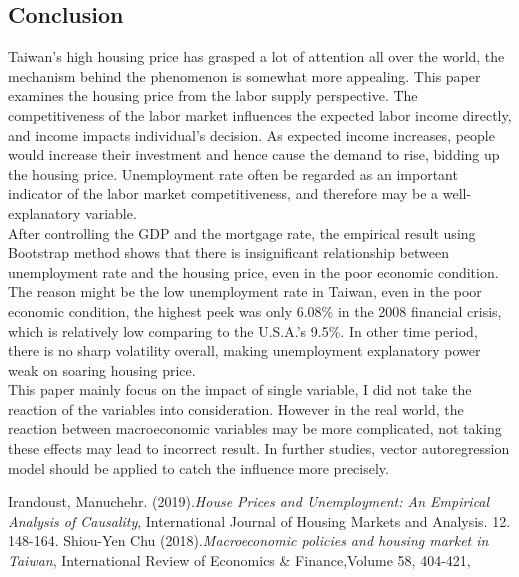 \documentclass[12pt]{article}
\begin{document}
\begin{spacing}{2}
\section{Conclusion}
Taiwan's high housing price has grasped a lot of attention all over the world, the mechanism behind the phenomenon is somewhat more appealing. This paper examines the housing price from the labor supply perspective. The competitiveness of the labor market influences the expected labor income directly, and income impacts individual's decision. As expected income increases, people would increase their investment and hence cause the demand to rise, bidding up the housing price. Unemployment rate often be regarded as an important indicator of the labor market competitiveness, and therefore may be a well-explanatory variable.  \\
\hspace*{0.5cm} After controlling the GDP and the mortgage rate, the empirical result using Bootstrap method shows that there is insignificant relationship between unemployment rate and the housing price, even in the poor economic condition. The reason might be the low unemployment rate in Taiwan, even in the poor economic condition, the highest peek was only 6.08\% in the 2008 financial crisis, which is relatively low comparing to the U.S.A.'s 9.5\%. In other time period, there is no sharp volatility overall, making unemployment explanatory power weak on soaring housing price.\\
\hspace*{0.5cm}This paper mainly focus on the impact of single variable, I did not take the reaction of the variables into consideration. However in the real world, the reaction between macroeconomic variables may be more complicated, not taking these effects may lead to incorrect result. In further studies, vector autoregression model should be applied to catch the influence more precisely.


\newpage
\begin{thebibliography}{1}
    Irandoust, Manuchehr. (2019).\emph{House Prices and Unemployment: An Empirical Analysis of Causality},
    International Journal of Housing Markets and Analysis. 12. 148-164. 
    Shiou-Yen Chu (2018).\emph{Macroeconomic policies and housing market in Taiwan},
    International Review of Economics \& Finance,Volume 58, 404-421,


\end{thebibliography}
\end{spacing}
\end{document}
